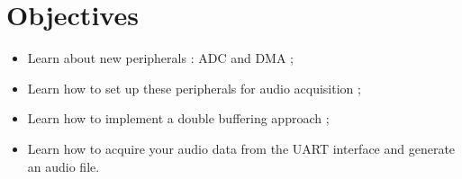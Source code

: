 \section*{Objectives}

\begin{itemize}
    \item Learn about new peripherals : ADC and DMA ;
    \item Learn how to set up these peripherals for audio acquisition ;

    \item Learn how to implement a double buffering approach ;
    \item Learn how to acquire your audio data from the UART interface and generate an audio file.
\end{itemize}
